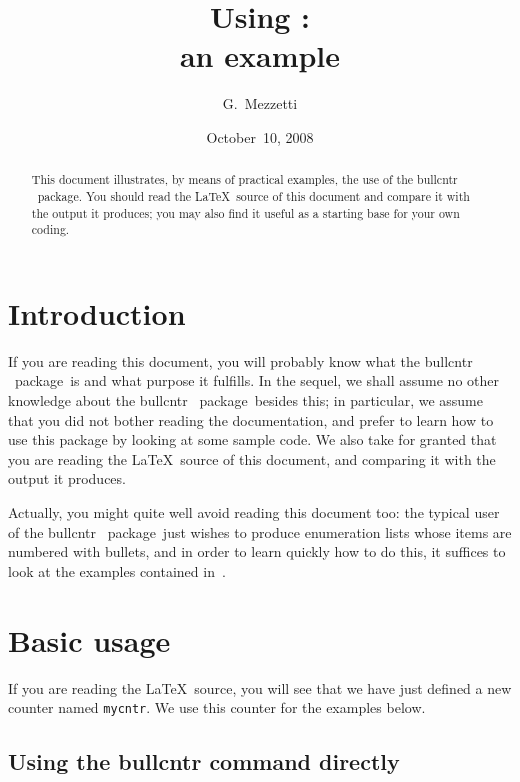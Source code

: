 \documentclass[a4paper]{article}
\title{Using \tbull:\\an example}
\author{G.~Mezzetti}
\date{October~10, 2008}
\DeclareRobustCommand*{\command}[1]{%
	{\texorpdfstring{\normalfont\ttfamily \char\escapechar}{\pdfbslash}#1}%
}
\DeclareRobustCommand*{\packlass}[1]{%
	{\texorpdfstring{\normalfont \sffamily}{}#1}%
}
\DeclareRobustCommand*{\cnt}[1]{\texttt{#1}}
\newcommand*{\Bullcntr}{bullcntr}
\newcommand*{\bull}{\packlass{\Bullcntr}}
\newcommand*{\tbull}{the \bull\ package}
\newcommand*{\pdfbslash}{}
{\catcode`\|=0 |catcode`|\=12 |gdef|pdfbslash{\\}}
\begin{document}
\maketitle

\begin{abstract}
	This document illustrates, by means of practical examples, the use
	of \tbull.  You should read the \LaTeX\ source of this document
	and compare it with the output it produces; you may also find it
	useful as a starting base for your own coding.
\end{abstract}

\tableofcontents



\setcounter{secnumdepth}{0}

\section{Introduction}

If you are reading this document, you will probably know what \tbull\
is and what purpose it fulfills.  In the sequel, we shall assume no
other knowledge about \tbull\ besides this; in particular, we assume
that you did not bother reading the documentation, and prefer to learn
how to use this package by looking at some sample code.  We also take
for granted that you are reading the \LaTeX\ source of this document,
and comparing it with the output it produces.

Actually, you might quite well avoid reading this document too: the
typical user of \tbull\ just wishes to produce enumeration lists whose
items are numbered with bullets, and in order to learn quickly how to
do this, it suffices to look at the examples contained
in~\cite{enum-sam}.



\setcounter{secnumdepth}{3}

\section{Basic usage}


If you are reading the \LaTeX\ source, you will see that we have just
defined a new counter named \cnt{mycntr}.  We use this counter for
the examples below.



\subsection{Using the \command{\Bullcntr} command directly}
\end{document}
